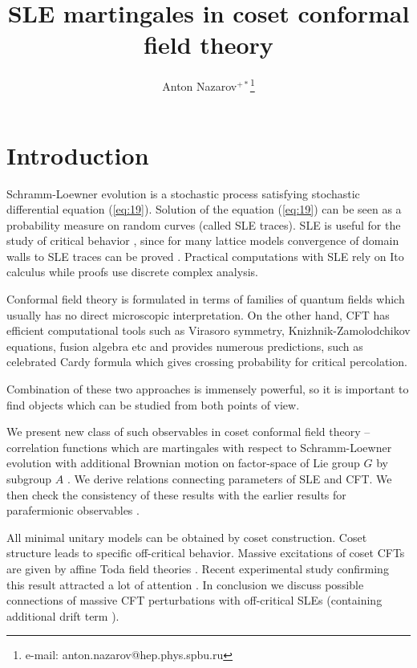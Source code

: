 \documentclass{jetpl}
\title{SLE martingales in coset conformal field theory}
\author{Anton Nazarov$^{+*}$\/\thanks{e-mail: anton.nazarov@hep.phys.spbu.ru}}
\begin{document}
\maketitle

\section{Introduction}
\label{sec:introduction}

Schramm-Loewner evolution \cite{schramm2000scaling} is a stochastic process satisfying stochastic differential equation (\ref{eq:19}). Solution of the equation (\ref{eq:19}) can be seen as a probability measure on random curves (called SLE traces). SLE is useful for the study of critical behavior \cite{Cardy:2005kh,rohde2005basic}, since for many lattice models convergence of  domain walls to SLE traces can be proved \cite{bauer20062d,schramm2006conformally}. Practical computations with SLE rely on Ito calculus while proofs use discrete complex analysis. 

Conformal field theory \cite{belavin1984ics} is formulated in terms of families of quantum fields which usually has no direct microscopic interpretation. On the other hand, CFT has efficient computational tools such as Virasoro symmetry, Knizhnik-Zamolodchikov equations, fusion algebra etc and provides numerous predictions, such as celebrated Cardy formula \cite{cardy1992critical,smirnov2001critical} which gives crossing probability for critical percolation. 

Combination of these two approaches is immensely powerful, so it is important to find objects which can be studied from both points of view.

We present new class of such observables in coset conformal field theory  -- correlation functions which are martingales with respect to Schramm-Loewner evolution with additional Brownian motion on factor-space of Lie group $G$ by subgroup $A$ \cite{2011arXiv1112.4354N}. We derive relations connecting parameters of SLE and CFT. We then check the consistency of these results with the earlier results  for parafermionic observables \cite{santachiara2008sle}. 

All minimal unitary models can be obtained by coset construction. Coset structure leads to specific off-critical behavior. Massive excitations of coset CFTs are given by affine Toda field theories \cite{fateev1990conformal,eguchi1989deformations,hollowood1989rational}. Recent experimental study confirming this result attracted a lot of attention \cite{coldea2010quantum}. In conclusion we discuss possible connections of massive CFT perturbations with  off-critical SLEs (containing additional drift term  \cite{makarov2010off}).
\end{document}
